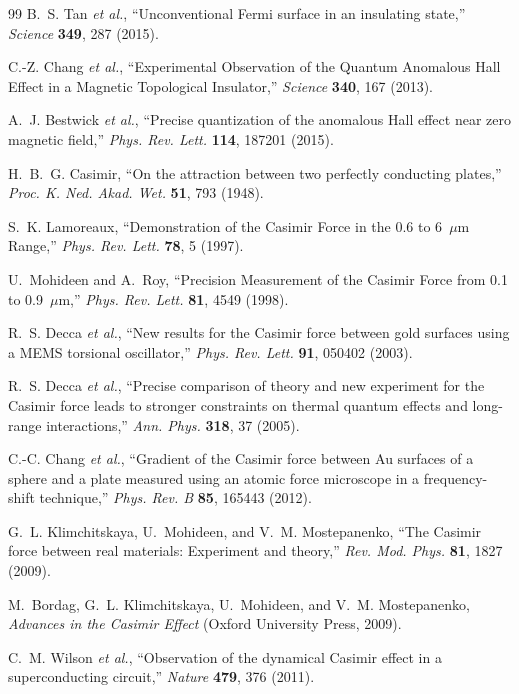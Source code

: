 \documentclass[aps,prb,twocolumn,superscriptaddress,floatfix,nofootinbib,longbibliography]{revtex4-2}
\begin{document}
\begin{thebibliography}{99}
B.~S. Tan \textit{et al.}, ``Unconventional Fermi surface in an insulating
state,'' \textit{Science} \textbf{349}, 287 (2015).

C.-Z. Chang \textit{et al.}, ``Experimental Observation of the Quantum
Anomalous Hall Effect in a Magnetic Topological Insulator,'' \textit{Science}
\textbf{340}, 167 (2013).

A.~J. Bestwick \textit{et al.}, ``Precise quantization of the anomalous
Hall effect near zero magnetic field,'' \textit{Phys. Rev. Lett.}
\textbf{114}, 187201 (2015).

H.~B.~G. Casimir, ``On the attraction between two perfectly conducting
plates,'' \textit{Proc. K. Ned. Akad. Wet.} \textbf{51}, 793 (1948).

S.~K. Lamoreaux, ``Demonstration of the Casimir Force in the 0.6 to
6~$\mu$m Range,'' \textit{Phys. Rev. Lett.} \textbf{78}, 5 (1997).

U.~Mohideen and A.~Roy, ``Precision Measurement of the Casimir Force from
0.1 to 0.9~$\mu$m,'' \textit{Phys. Rev. Lett.} \textbf{81}, 4549 (1998).

R.~S. Decca \textit{et al.}, ``New results for the Casimir force between
gold surfaces using a MEMS torsional oscillator,'' \textit{Phys. Rev. Lett.}
\textbf{91}, 050402 (2003).

R.~S. Decca \textit{et al.}, ``Precise comparison of theory and new
experiment for the Casimir force leads to stronger constraints on thermal
quantum effects and long-range interactions,'' \textit{Ann. Phys.}
\textbf{318}, 37 (2005).

C.-C. Chang \textit{et al.}, ``Gradient of the Casimir force between Au
surfaces of a sphere and a plate measured using an atomic force
microscope in a frequency-shift technique,'' \textit{Phys. Rev. B}
\textbf{85}, 165443 (2012).

G.~L. Klimchitskaya, U.~Mohideen, and V.~M. Mostepanenko, ``The Casimir
force between real materials: Experiment and theory,'' \textit{Rev. Mod. Phys.}
\textbf{81}, 1827 (2009).

M.~Bordag, G.~L. Klimchitskaya, U.~Mohideen, and V.~M. Mostepanenko,
\textit{Advances in the Casimir Effect} (Oxford University Press, 2009).

C.~M. Wilson \textit{et al.}, ``Observation of the dynamical Casimir effect
in a superconducting circuit,'' \textit{Nature} \textbf{479}, 376 (2011).


\end{thebibliography}
\end{document}

